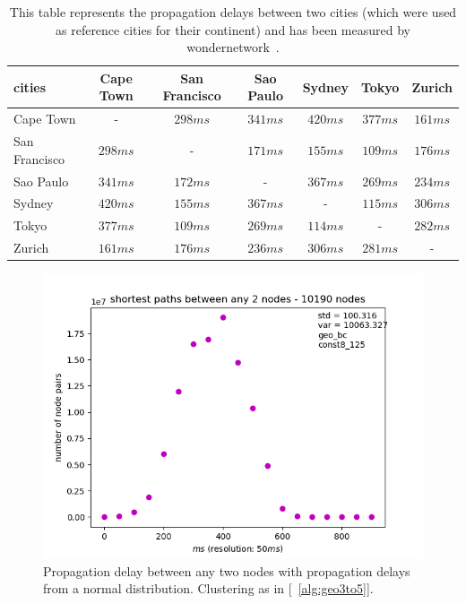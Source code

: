 \documentclass[a4paper, oneside]{discothesis}
\begin{document}
\begin{table}
  \centering
  \begin{tabular}{ | l || c | c | c | c | c | c | }
    \hline
    cities & Cape Town & San Francisco & Sao Paulo & Sydney & Tokyo & Zurich \\ \hline \hline
    Cape Town & - & $298ms$ & $341ms$ & $420ms$ & $377ms$ & $161ms$ \\ \hline
    San Francisco & $298ms$ & - & $171ms$ & $155ms$ & $109ms$ & $176ms$ \\ \hline
    Sao Paulo & $341ms$ & $172ms$ & - & $367ms$ & $269ms$ & $234ms$ \\ \hline
    Sydney & $420ms$ & $155ms$ & $367ms$ & - & $115ms$ & $306ms$ \\ \hline
    Tokyo & $377ms$ & $109ms$ & $269ms$ & $114ms$ & - & $282ms$ \\ \hline
    Zurich & $161ms$ & $176ms$ & $236ms$ & $306ms$ & $281ms$ & - \\ \hline
  \end{tabular}
  
  \caption{This table represents the propagation delays between two cities (which were used as reference cities for their continent) and has been measured by wondernetwork~\cite{pingLookup}.} \label{table:propagationDelayInternational}
\end{table}

\begin{figure}
    \centering
    \includegraphics[width=.8\columnwidth]{figures/geoCluster/const8_125/geo/final-shortest-paths-between-any-nodes-10190-nodes.png}
    \caption{Propagation delay between any two nodes with propagation delays from a normal distribution. Clustering as in [~\ref{alg:geo3to5}].}
    \label{fig:geoCluster-const8_125-geo-shortest-path}
\end{figure}
\end{document}
